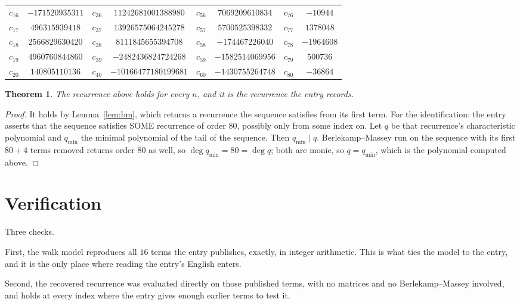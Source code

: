 \documentclass[11pt,a4paper]{article}
\theoremstyle{plain}
\newtheorem{theorem}{Theorem}
\theoremstyle{definition}
\begin{document}
\begin{center}
\begin{tabular}{cccccccc}
$c_{16}$ & $-171520935311$ & $c_{36}$ & $11242681001388980$ & $c_{56}$ & $7069209610834$ & $c_{76}$ & $-10944$ \\
$c_{17}$ & $496315939418$ & $c_{37}$ & $13926575064245278$ & $c_{57}$ & $5700525398332$ & $c_{77}$ & $1378048$ \\
$c_{18}$ & $2566829630420$ & $c_{38}$ & $8111845655394708$ & $c_{58}$ & $-174467226040$ & $c_{78}$ & $-1964608$ \\
$c_{19}$ & $4960760844860$ & $c_{39}$ & $-2482436824724268$ & $c_{59}$ & $-1582514069956$ & $c_{79}$ & $500736$ \\
$c_{20}$ & $140805110136$ & $c_{40}$ & $-10166477180199681$ & $c_{60}$ & $-1430755264748$ & $c_{80}$ & $-36864$ \\
\end{tabular}
\end{center}

\begin{theorem}
The recurrence above holds for every $n$, and it is the recurrence the entry records.
\end{theorem}

\begin{proof}
It holds by Lemma~\ref{lem:bm}, which returns a recurrence the sequence satisfies from its
first term. For the identification: the entry asserts that the sequence satisfies SOME
recurrence of order $80$, possibly only from some index on. Let $q$ be that recurrence's
characteristic polynomial and $q_{\min}$ the minimal polynomial of the tail of the sequence.
Then $q_{\min}\mid q$. Berlekamp--Massey run on the sequence with its first $80+4$ terms
removed returns order $80$ as well, so $\deg q_{\min}=80=\deg q$; both are monic, so
$q=q_{\min}$, which is the polynomial computed above.
\end{proof}

\section{Verification}

Three checks.

First, the walk model reproduces all $16$ terms the entry publishes, exactly, in integer
arithmetic. This is what ties the model to the entry, and it is the only place where reading
the entry's English enters.

Second, the recovered recurrence was evaluated directly on those published terms, with no
matrices and no Berlekamp--Massey involved, and holds at every index where the entry gives
enough earlier terms to test it.
\end{document}
